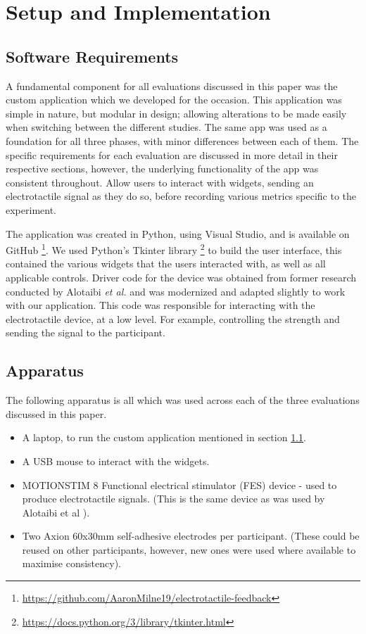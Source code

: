\documentclass{mpaper}
\begin{document}
\section{Setup and Implementation}
\subsection{Software Requirements} \label{software-requirements}
A fundamental component for all evaluations discussed in this paper was the custom application which we developed for the occasion. This application was simple in nature, but modular in design; allowing alterations to be made easily when switching between the different studies. The same app was used as a foundation for all three phases, with minor differences between each of them. The specific requirements for each evaluation are discussed in more detail in their respective sections, however, the underlying functionality of the app was consistent throughout. Allow users to interact with widgets, sending an electrotactile signal as they do so, before recording various metrics specific to the experiment.

The application was created in Python, using Visual Studio, and is available on GitHub \footnote{\url{https://github.com/AaronMilne19/electrotactile-feedback}}. We used Python's Tkinter library \footnote{\url{https://docs.python.org/3/library/tkinter.html}} to build the user interface, this contained the various widgets that the users interacted with, as well as all applicable controls. Driver code for the device was obtained from former research conducted by Alotaibi \emph{et al.} \cite{9086329, 10.1145/3491102.3501863} and was modernized and adapted slightly to work with our application. This code was responsible for interacting with the electrotactile device, at a low level. For example, controlling the strength and sending the signal to the participant.

\subsection{Apparatus}\label{sec:apparaus}
The following apparatus is all which was used across each of the three evaluations discussed in this paper.
\begin{itemize}
    \item A laptop, to run the custom application mentioned in section \ref{software-requirements}.
    \item A USB mouse to interact with the widgets.
    \item MOTIONSTIM 8 Functional electrical stimulator (FES) device - used to produce electrotactile signals. (This is the same device as was used by Alotaibi et al \cite{9086329, 10.1145/3491102.3501863}).
    \item Two Axion 60x30mm self-adhesive electrodes per participant. (These could be reused on other participants, however, new ones were used where available to maximise consistency).
\end{itemize}
\end{document}
